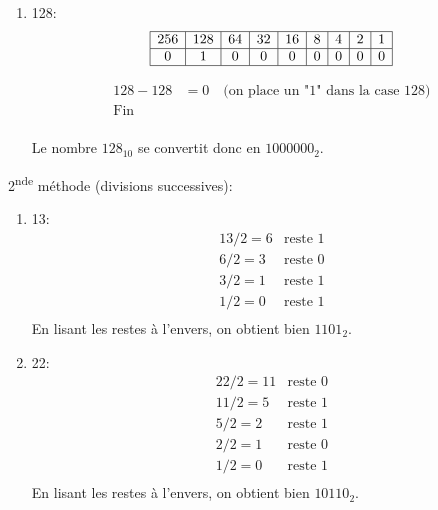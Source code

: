 \documentclass[12pt]{article}
\newenvironment{MaReponse}
		{\begin{greyedtextbox}\itshape} %
		{\end{greyedtextbox}}            %
\newenvironment{alphenum}
{\begin{enumerate}[label=\alph*.]}
	{\end{enumerate}}
\begin{document}
\begin{MaReponse}
\begin{alphenum}
				Le nombre \(22_{10}\) se convertit donc en \(10110_{2}\).
			\item 128:
				\[
				\begin{array}{|c|c|c|c|c|c|c|c|c|}
					\hline
					256 & 128 & 64 & 32 & 16 & 8 & 4 & 2 & 1 \\
					\hline
					0 & 1 & 0 & 0 & 0 & 0 & 0 & 0 & 0\\
					\hline
				\end{array}
				\]
				
				\[
				\begin{array}{ll}
					128 - 128 &= 0 \quad \text{(on place un "1" dans la case \(128\))} \\
					\text{Fin} & \\
				\end{array}
				\]
				
				Le nombre \(128_{10}\) se convertit donc en \(1000000_{2}\).
			
		\end{alphenum}
		
		2\textsuperscript{nde} méthode (divisions successives):
		\begin{alphenum}
			\item 13:
				\[
				\begin{array}{ll}
					13 / 2 = 6 & \text{reste } 1 \\
					6 / 2 = 3 & \text{reste } 0 \\
					3 / 2 = 1 & \text{reste } 1 \\
					1 / 2 = 0 & \text{reste } 1 \\
				\end{array}
				\]
				En lisant les restes à l'envers, on obtient bien \(1101_{2}\).
			
			\item 22:
				\[
				\begin{array}{ll}
					22/ 2 = 11 & \text{reste } 0 \\
					11 / 2 = 5 & \text{reste } 1 \\
					5 / 2 = 2 & \text{reste } 1 \\
					2 / 2 = 1 & \text{reste } 0 \\
					1 / 2 = 0 & \text{reste } 1 \\
				\end{array}
				\]
				En lisant les restes à l'envers, on obtient bien \(10110_{2}\).
				

\end{alphenum}
\end{MaReponse}
\end{document}
